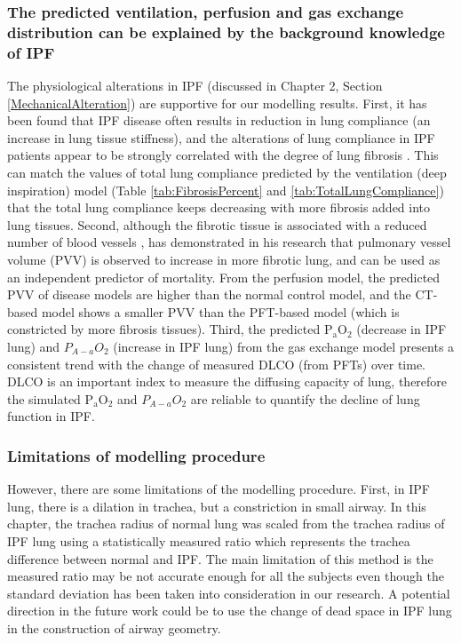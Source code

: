 \subsubsection{The predicted ventilation, perfusion and gas exchange distribution can be explained by the background knowledge of IPF}
The physiological alterations in IPF (discussed in Chapter 2, Section \ref{MechanicalAlteration}) are supportive for our modelling results. First, it has been found that IPF disease often results in reduction in lung compliance (an increase in lung tissue stiffness), and the alterations of lung compliance in IPF patients appear to be strongly correlated with the degree of lung fibrosis \citep{fulmer1979morphologic,plantier2018physiology}. This can match the values of total lung compliance predicted by the ventilation (deep inspiration) model (Table \ref{tab:FibrosisPercent} and \ref{tab:TotalLungCompliance}) that the total lung compliance keeps decreasing with more fibrosis added into lung tissues. Second, although the fibrotic tissue is associated with a reduced number of blood vessels \citep{cosgrove2004pigment,ebina2004heterogeneous}, \cite{Jacob2016Mortality, Jacob2016Evaluation} has demonstrated in his research that pulmonary vessel volume (PVV) is observed to increase in more fibrotic lung, and can be used as an independent predictor of mortality. From the perfusion model, the predicted PVV of disease models are higher than the normal control model, and the CT-based model shows a smaller PVV than the PFT-based model (which is constricted by more fibrosis tissues). Third, the predicted $\mathrm{P_aO_2}$ (decrease in IPF lung) and $P_{A-a}O_2$ (increase in IPF lung) from the gas exchange model presents a consistent trend with the change of measured DLCO (from PFTs) over time. DLCO is an important index to measure the diffusing capacity of lung, therefore the simulated $\mathrm{P_aO_2}$ and $P_{A-a}O_2$ are reliable to quantify the decline of lung function in IPF. 

\subsubsection{Limitations of modelling procedure}
However, there are some limitations of the modelling procedure. First, in IPF lung, there is a dilation in trachea, but a constriction in small airway. In this chapter, the trachea radius of normal lung was scaled from the trachea radius of IPF lung using a statistically measured ratio which represents the trachea difference between normal and IPF. The main limitation of this method is the measured ratio may be not accurate enough for all the subjects even though the standard deviation has been taken into consideration in our research. A potential direction in the future work could be to use the change of dead space in IPF lung in the construction of airway geometry. 

